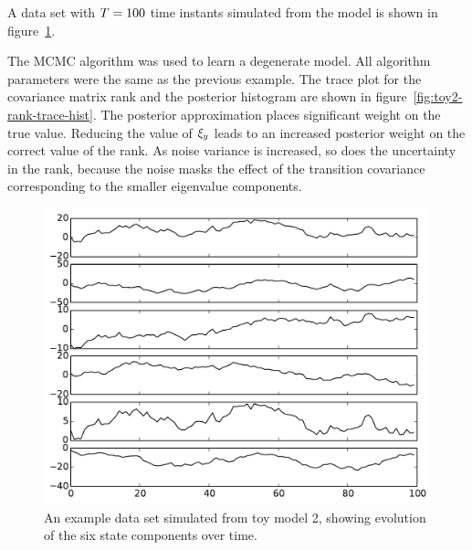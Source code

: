 \documentclass[journal,10pt]{IEEEtran}
\begin{document}
A data set with $T=100$ time instants simulated from the model is shown in figure~\ref{fig:toy2-data}.

The MCMC algorithm was used to learn a degenerate model. All algorithm parameters were the same as the previous example. The trace plot for the covariance matrix rank and the posterior histogram are shown in figure~\ref{fig:toy2-rank-trace-hist}. The posterior approximation places significant weight on the true value. Reducing the value of $\xi_{y_{}}$ leads to an increased posterior weight on the correct value of the rank. As noise variance is increased, so does the uncertainty in the rank, because the noise masks the effect of the transition covariance corresponding to the smaller eigenvalue components.

\begin{figure}
 \centering
 \includegraphics[width=0.9\columnwidth]{figures/toy2-state.pdf}
 \caption{An example data set simulated from toy model 2, showing evolution of the six state components over time.}
 \label{fig:toy2-data}
\end{figure}
\end{document}
